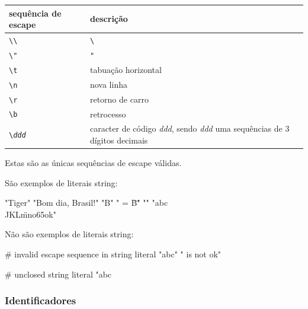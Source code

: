 \documentclass[a4paper,11pt,brazil]{article}
\begin{document}
\begin{center}
  \begin{tabularx}{\linewidth}{|l|X|}\hline
    \textbf{sequência de escape}                      & \textbf{descrição}                                                              \\\hline
    \texttt{\textbackslash \textbackslash}            & \texttt{\textbackslash}                                                         \\\hline
    \texttt{\textbackslash "}                         & \texttt{"}                                                                      \\\hline
    \texttt{\textbackslash t}                         & tabuação horizontal                                                             \\\hline
    \texttt{\textbackslash n}                         & nova linha                                                                      \\\hline
    \texttt{\textbackslash r}                         & retorno de carro                                                                \\\hline
    \texttt{\textbackslash b}                         & retrocesso                                                                      \\\hline
    \texttt{\textbackslash \emph{ddd}}                & caracter de código \emph{ddd}, sendo \emph{ddd} uma sequências de 3 dígitos decimais          \\\hline
  \end{tabularx}
\end{center}

Estas são as únicas sequências de escape válidas.

São exemplos de literais string:
\begin{pygmented}[lang=text]
"Tiger"
"Bom dia, Brasil!"
"B"
" = \"B\""
""
"abc\tDEF\nGHI\\JKL\"mno\065ok"
\end{pygmented}

Não são exemplos de literais string:
\begin{pygmented}[lang=text]
# invalid escape sequence in string literal
"abc\kdef"
" is not ok"

# unclosed string literal
"abc
\end{pygmented}


\subsubsection{Identificadores}
\end{document}
